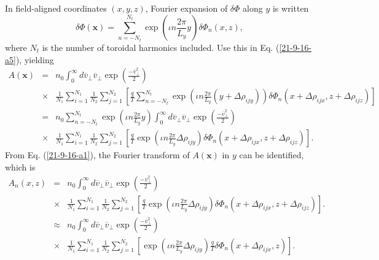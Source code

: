 \documentclass{llncs}
\begin{document}
In field-aligned coordinates $(x, y, z)$, Fourier expansion of $\delta \Phi$
along $y$ is written
\begin{equation}
  \delta \Phi (\mathbf{x}) = \sum_{n = - N_t}^{N_t} \exp \left( \iota n
  \frac{2 \pi}{L_y} y \right) \delta \Phi_n (x, z),
\end{equation}
where $N_t$ is the number of toroidal harmonics included. Use this in Eq.
(\ref{21-9-16-a5}), yielding
\begin{eqnarray}
  A (\mathbf{x}) & = & n_0  \int_0^{\infty} d \overline{v}_{\perp}
  \overline{v}_{\perp} \exp \left( \frac{- \overline{v}^2_{\perp}}{2} \right)
  \nonumber\\
  & \times & \frac{1}{N_1} \sum_{i = 1}^{N_1} \frac{1}{N_2}  \sum_{j =
  1}^{N_2} \left[ \frac{q}{T}  \sum_{n = - N_t}^{N_t} \exp \left( \iota n
  \frac{2 \pi}{L_y} (y + \Delta \rho_{i j y}) \right) \delta \Phi_n (x +
  \Delta \rho_{i j x}, z + \Delta \rho_{i j z}) \right] \nonumber\\
  & = & n_0  \sum_{n = - N_t}^{N_t} \exp \left( \iota n \frac{2 \pi}{L_y} y
  \right) \int_0^{\infty} d \overline{v}_{\perp} \overline{v}_{\perp} \exp
  \left( \frac{- \overline{v}^2_{\perp}}{2} \right) \nonumber\\
  & \times & \frac{1}{N_1} \sum_{i = 1}^{N_1} \frac{1}{N_2}  \sum_{j =
  1}^{N_2} \left[ \frac{q}{T} \exp \left( \iota n \frac{2 \pi}{L_y} \Delta
  \rho_{i j y} \right) \delta \Phi_n (x + \Delta \rho_{i j x}, z + \Delta
  \rho_{i j z}) \right] .  \label{21-9-16-a1}
\end{eqnarray}
From Eq. (\ref{21-9-16-a1}), the Fourier transform of $A (\mathbf{x})$ in $y$
can be identified, which is
\begin{eqnarray}
  A_n (x, z) & = & n_0  \int_0^{\infty} d \overline{v}_{\perp}
  \overline{v}_{\perp} \exp \left( \frac{- \overline{v}^2_{\perp}}{2} \right)
  \nonumber\\
  & \times & \frac{1}{N_1} \sum_{i = 1}^{N_1} \frac{1}{N_2}  \sum_{j =
  1}^{N_2} \left[ \frac{q}{T} \exp \left( \iota n \frac{2 \pi}{L_y} \Delta
  \rho_{i j y} \right) \delta \Phi_n (x + \Delta \rho_{i j x}, z + \Delta
  \rho_{i j z}) \right] . \nonumber\\
  & \approx & n_0  \int_0^{\infty} d \overline{v}_{\perp}
  \overline{v}_{\perp} \exp \left( \frac{- \overline{v}^2_{\perp}}{2} \right)
  \nonumber\\
  & \times & \frac{1}{N_1} \sum_{i = 1}^{N_1} \frac{1}{N_2}  \sum_{j =
  1}^{N_2} \left[ \exp \left( \iota n \frac{2 \pi}{L_y} \Delta \rho_{i j y}
  \right) \frac{q}{T} \delta \Phi_n (x + \Delta \rho_{i j x}, z) \right] . 
\end{eqnarray}
\end{document}
